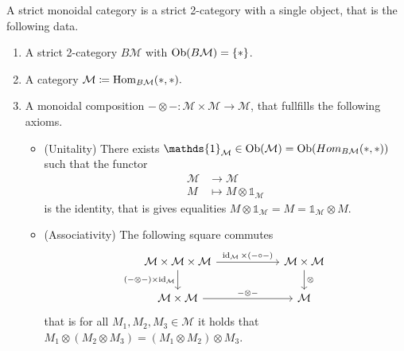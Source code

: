\begin{defi}
	A strict monoidal category is a strict 2-category with a single object, that is the following data.
	\begin{enumerate}
		\item 
		A strict 2-category $B \mathcal{ M }$ with $\operatorname{Ob} ( B \mathcal{ M } ) = \{ * \} $.
		
		\item 
		A category $ \mathcal{ M } \coloneqq \operatorname{Hom}_{ B \mathcal{ M }  } ( * , * ).$
		
		\item 
		A monoidal composition $ - \otimes - \colon \mathcal{ M } \times \mathcal{ M } \to \mathcal{ M } $, that fullfills 
		the following axioms.
		
		\begin{itemize}
			\item 
			(Unitality)
			There exists $ \mathds{ 1 }_{ \mathcal{ M } } \in \Ob( \mathcal{ M } ) = \Ob ( Hom_{ B \mathcal{M} } ( * , * ) )$ such that the functor 
			\begin{align*}
				\mathcal{ M } 
				& \to
				\mathcal{ M }
				\\
				M
				&\mapsto 
				M \otimes \mathds{1}_{\mathcal{ M } }
			\end{align*}
			is the identity, that is
			gives equalities $ M \otimes  \mathds{1}_{ \mathcal{M} } = M = \mathds{1}_{\mathcal{ M } } \otimes M$.
			
			\item 
			(Associativity)
			The following square commutes
			\[
			\begin{tikzcd}[column sep = 2cm]
				\mathcal{M} \times \mathcal{ M } \times  \mathcal{ M }
				\ar[r, " \id_{ \mathcal{ M } } \times  ( - \circ - )"]
				\ar[d, " ( - \otimes - ) \times \id_{ \mathcal{ M }}"']
				&
				\mathcal{ M  } \times \mathcal{ M }
				\ar[d, "\otimes "]
				\\
				\mathcal{ M } \times \mathcal{ M }
				\ar[r, " - \otimes - " ]
				&
				\mathcal{ M } 
			\end{tikzcd}
			\]
			that is for all $ M_1 , M_2 , M_3 \in \mathcal{ M } $ 
			it holds that $ M_1 \otimes  ( M_2 \otimes M_3 ) = ( M_1 \otimes M_2 ) \otimes M_3$.
		\end{itemize}
	\end{enumerate}		
\end{defi}

